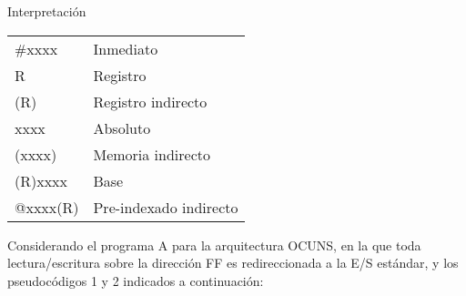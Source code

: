 \documentclass[12pt,a4paper]{article}
\begin{document}
\begin{center}
	\begin{minipage}{0.3\textwidth}
		Interpretación
		\begin{tabular}{ll}
			\#xxxx   & Inmediato\\
			R       & Registro \\
			(R)     & Registro indirecto\\
			xxxx    & Absoluto \\
			(xxxx)  & Memoria indirecto\\
			(R)xxxx & Base \\
			@xxxx(R) & Pre-indexado indirecto
		\end{tabular}
	\end{minipage}
\end{center}

 Considerando el programa A para la arquitectura OCUNS, en la que toda lectura/escritura sobre la dirección FF es redireccionada a la E/S estándar, y los pseudocódigos 1 y 2 indicados a continuación: \\ [2.5mm]
\end{document}
